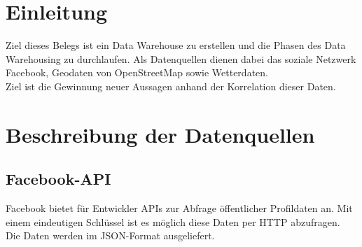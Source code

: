 \documentclass[a4paper,12pt]{scrartcl}
\begin{document}

\tableofcontents

\clearpage

\onehalfspacing


\clearpage
\listoffigures

\clearpage
\section{Einleitung}
Ziel dieses Belegs ist ein Data Warehouse zu erstellen und die Phasen des Data Warehousing zu durchlaufen. Als Datenquellen dienen dabei das soziale Netzwerk Facebook, Geodaten von OpenStreetMap sowie Wetterdaten.\\
Ziel ist die Gewinnung neuer Aussagen anhand der Korrelation dieser Daten.

\clearpage
\section{Beschreibung der Datenquellen}

\subsection{Facebook-API}

Facebook bietet für Entwickler APIs zur Abfrage öffentlicher Profildaten an.
Mit einem eindeutigen Schlüssel ist es möglich diese Daten per HTTP abzufragen.\\
Die Daten werden im JSON-Format ausgeliefert.
\end{document}
